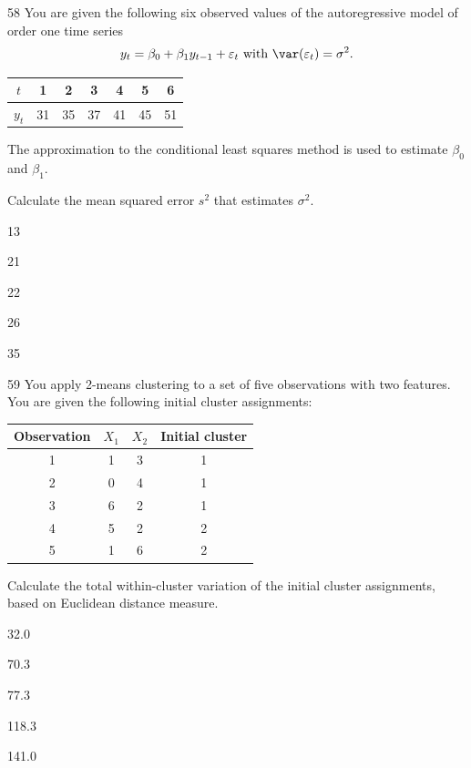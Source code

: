 \begin{question}{58}
You are given the following six observed values of the autoregressive model of order one time series
\[ y_t = \beta_0 + \beta_1 y_{t-1} + \varepsilon_t \text{ with } \var(\varepsilon_t) = \sigma^2. \]
\begin{center}
\begin{tabular}{|c|c|c|c|c|c|c|}
\hline
$t$   & 1  & 2  & 3  & 4  & 5  & 6  \\ \hline
$y_t$ & 31 & 35 & 37 & 41 & 45 & 51 \\ \hline
\end{tabular}
\end{center}

The approximation to the conditional least squares method is used to estimate $\beta_0$ and $\beta_1$.

Calculate the mean squared error $s^2$ that estimates $\sigma^2$.

\begin{choices}
\item 13
\item 21
\item 22
\item 26
\item 35
\end{choices}
\end{question}

\begin{question}{59}
You apply 2-means clustering to a set of five observations with two features. You are given the following initial cluster assignments:
\begin{center}
\begin{tabular}{|c|c|c|c|}
\hline
Observation & $X_1$ & $X_2$ & Initial cluster \\ \hline
1 & 1 & 3 & 1 \\ \hline
2 & 0 & 4 & 1 \\ \hline
3 & 6 & 2 & 1 \\ \hline
4 & 5 & 2 & 2 \\ \hline
5 & 1 & 6 & 2 \\ \hline
\end{tabular}
\end{center}

Calculate the total within-cluster variation of the initial cluster assignments, based on Euclidean distance measure.

\begin{choices}
\item 32.0
\item 70.3
\item 77.3
\item 118.3
\item 141.0
\end{choices}
\end{question}

